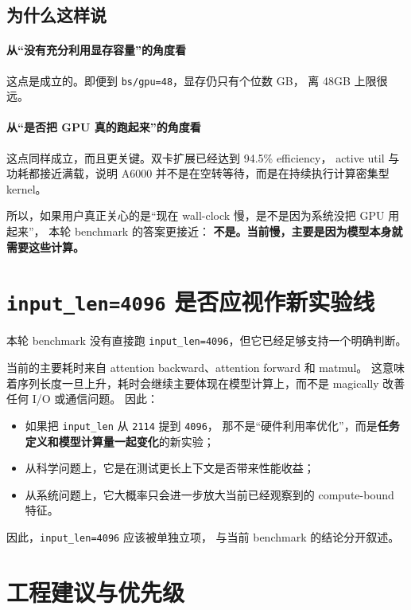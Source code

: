 \documentclass[11pt,a4paper]{ctexart}
\begin{document}
\subsection{为什么这样说}

\paragraph{从“没有充分利用显存容量”的角度看}
这点是成立的。即便到 \texttt{bs/gpu=48}，显存仍只有个位数 GB，
离 48GB 上限很远。

\paragraph{从“是否把 GPU 真的跑起来”的角度看}
这点同样成立，而且更关键。双卡扩展已经达到 94.5\% efficiency，
active util 与功耗都接近满载，说明 A6000 并不是在空转等待，而是在持续执行计算密集型 kernel。

所以，如果用户真正关心的是“现在 wall-clock 慢，是不是因为系统没把 GPU 用起来”，
本轮 benchmark 的答案更接近：
\textbf{不是。当前慢，主要是因为模型本身就需要这些计算。}

\section{\texttt{input\_len=4096} 是否应视作新实验线}

本轮 benchmark 没有直接跑 \texttt{input\_len=4096}，但它已经足够支持一个明确判断。

当前的主要耗时来自 attention backward、attention forward 和 matmul。
这意味着序列长度一旦上升，耗时会继续主要体现在模型计算上，而不是 magically 改善任何 I/O 或通信问题。
因此：
\begin{itemize}[leftmargin=2em]
  \item 如果把 \texttt{input\_len} 从 \texttt{2114} 提到 \texttt{4096}，
  那不是“硬件利用率优化”，而是\textbf{任务定义和模型计算量一起变化}的新实验；
  \item 从科学问题上，它是在测试更长上下文是否带来性能收益；
  \item 从系统问题上，它大概率只会进一步放大当前已经观察到的 compute-bound 特征。
\end{itemize}

因此，\texttt{input\_len=4096} 应该被单独立项，
与当前 benchmark 的结论分开叙述。

\section{工程建议与优先级}
\end{document}
